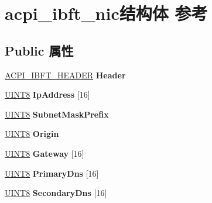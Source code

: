\hypertarget{structacpi__ibft__nic}{}\section{acpi\+\_\+ibft\+\_\+nic结构体 参考}
\label{structacpi__ibft__nic}
\subsection*{Public 属性}
\begin{DoxyCompactItemize}
\item 
\mbox{\label{structacpi__ibft__nic_a9c97fbeaed52cec5e607744b1a4efc2c}} 
\hyperlink{structacpi__ibft__header}{A\+C\+P\+I\+\_\+\+I\+B\+F\+T\+\_\+\+H\+E\+A\+D\+ER} {\bfseries Header}
\item 
\mbox{\label{structacpi__ibft__nic_a967d3000fe942998db8abbf385b31fff}} 
\hyperlink{_processor_bind_8h_ab27e9918b538ce9d8ca692479b375b6a}{U\+I\+N\+T8} {\bfseries Ip\+Address} \mbox{[}16\mbox{]}
\item 
\mbox{\label{structacpi__ibft__nic_a354ef38abd0a9724efcdf268885981d2}} 
\hyperlink{_processor_bind_8h_ab27e9918b538ce9d8ca692479b375b6a}{U\+I\+N\+T8} {\bfseries Subnet\+Mask\+Prefix}
\item 
\mbox{\label{structacpi__ibft__nic_a461a14eb1eee55420137bfe86b705fb4}} 
\hyperlink{_processor_bind_8h_ab27e9918b538ce9d8ca692479b375b6a}{U\+I\+N\+T8} {\bfseries Origin}
\item 
\mbox{\label{structacpi__ibft__nic_a9dcbf8703a0a7c3732b63e931ed7747d}} 
\hyperlink{_processor_bind_8h_ab27e9918b538ce9d8ca692479b375b6a}{U\+I\+N\+T8} {\bfseries Gateway} \mbox{[}16\mbox{]}
\item 
\mbox{\label{structacpi__ibft__nic_a02dfe899b6fcd4fe1fe1fbaa3f5cddab}} 
\hyperlink{_processor_bind_8h_ab27e9918b538ce9d8ca692479b375b6a}{U\+I\+N\+T8} {\bfseries Primary\+Dns} \mbox{[}16\mbox{]}
\item 
\mbox{\label{structacpi__ibft__nic_a283cb96dcd7591765b5e4089adb32d94}} 
\hyperlink{_processor_bind_8h_ab27e9918b538ce9d8ca692479b375b6a}{U\+I\+N\+T8} {\bfseries Secondary\+Dns} \mbox{[}16\mbox{]}

\end{DoxyCompactItemize}
